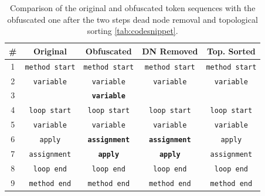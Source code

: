 \begin{table}
    \centering
    \caption{Comparison of the original and obfuscated token sequences with the obfuscated one after the two steps dead node removal and topological sorting \autoref{tab:codesnippet}.}
    \label{tab:tokensfull}
    \scriptsize
    \begin{tabular}{ccccc}
        \hline
        \# & \textbf{Original} & \textbf{Obfuscated} & \textbf{DN Removed} & \textbf{Top. Sorted} \\
        \hline
        1  & \scriptsize\texttt{method start} & \scriptsize\texttt{method start} & \scriptsize\texttt{method start} & \scriptsize\texttt{method start} \\
        2  & \scriptsize\texttt{variable}     & \scriptsize\texttt{variable}     & \scriptsize\texttt{variable}     & \scriptsize\texttt{variable}     \\
        3  &                                  & \scriptsize\texttt{\textbf{variable}}     &                                  &                                   \\
        4  & \scriptsize\texttt{loop start}   & \scriptsize\texttt{loop start}   & \scriptsize\texttt{loop start}   & \scriptsize\texttt{loop start}   \\
        5  & \scriptsize\texttt{variable}     & \scriptsize\texttt{variable}     & \scriptsize\texttt{variable}     & \scriptsize\texttt{variable}     \\
        6  & \scriptsize\texttt{apply}        & \scriptsize\texttt{\textbf{assignment}}   & \scriptsize\texttt{\textbf{assignment}}   & \scriptsize\texttt{apply}   \\
        7  & \scriptsize\texttt{assignment}   & \scriptsize\texttt{\textbf{apply}}        & \scriptsize\texttt{\textbf{apply}}        & \scriptsize\texttt{assignment}        \\
        8  & \scriptsize\texttt{loop end}     & \scriptsize\texttt{loop end}     & \scriptsize\texttt{loop end}     & \scriptsize\texttt{loop end}     \\
        9  & \scriptsize\texttt{method end}   & \scriptsize\texttt{method end}   & \scriptsize\texttt{method end}   & \scriptsize\texttt{method end}   \\
        \hline
    \end{tabular}
\end{table}